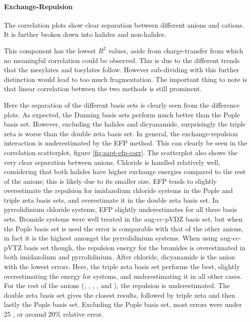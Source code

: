 \paragraph{Exchange-Repulsion}
The correlation plots show clear separation between different anions and cations.
It is further broken down into halides and non-halides.

This component has the lowest $R^2$ values, aside from charge-transfer from which no meaningful correlation could be observed. 
This is due to the different trends that the mesylates and tosylates follow. 
However sub-dividing with this further distinction would lead to too much fragmentation. 
The important thing to note is that linear correlation between the two methods is still prominent.

Here the separation of the different basis sets is clearly seen from the difference plots.
As expected, the Dunning basis sets perform much better than the Pople basis set. 
However, excluding the halides and dicyanamide, surprisingly the triple zeta is worse than the double zeta basis set.
In general, the exchange-repulsion interaction is underestimated by the EFP method. 
This can clearly be seen in the correlation scatterplot, figure
\ref{fig:sapt-efp-corr}.
The scatterplot also shows the very clear separation between anions.
Chloride is handled relatively well, considering that both halides have higher exchange energies compared to the rest of the anions; this is likely due to its smaller size.
EFP tends to slightly overestimate the repulsion for imidazolium chloride systems in the Pople and triple zeta basis sets, and overestimate it in the double zeta basis set.
In pyrrolidinium chloride systems, EFP slightly underestimates for all three basis sets. 
Bromide systems were well treated in the aug-cc-pVDZ basis set, but when the Pople basis set is used the error is comparable with that of the other anions, in fact it is the highest amongst the pyrrolidinium systems.
When using aug-cc-pVTZ basis set though, the repulsion energy for the bromides is overestimated in both imidazolium and pyrrolidinium.
After chloride, dicyanamide is the anion with the lowest errors.
Here, the triple zeta basis set performs the best, slightly overestimating the energy for  systems, and underestimating it in all other cases.
For the rest of the anions (\bfl, \mes, \ntf, \pf, and \tos), the repulsion is underestimated. 
The double zeta basis set gives the closest results, followed by triple zeta and then lastly the Pople basis set.
Excluding the Pople basis set, most errors were under 25 \enUnit, or around 20\% relative error.
